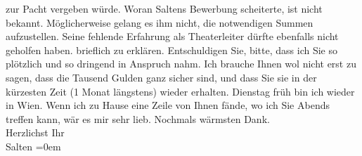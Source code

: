 \begin{ledgroupsized}[t]{13cm}
{{{                  zur Pacht vergeben würde. Woran Saltens
                  Bewerbung scheiterte, ist nicht bekannt. Möglicherweise gelang es ihm nicht, die
                  notwendigen Summen aufzustellen. Seine fehlende Erfahrung als Theaterleiter dürfte
                  ebenfalls nicht geholfen haben.}}}\label{K_L03291-1h} brieflich zu erklären. Entschuldigen Sie,
               bitte, dass ich Sie so plötzlich und so dringend in Anspruch nahm. Ich brauche Ihnen
               wol nicht erst zu sagen, dass die Tausend Gulden ganz sicher sind, und dass Sie sie
               in der kürzesten Zeit (1 Monat längstens) wieder erhalten. \pend
           \pstart
           Dienstag früh bin ich wieder in Wien.
               Wenn ich zu Hause eine Zeile von Ihnen fände, wo ich Sie Abends {\pb}treffen kann, wär es mir sehr
               lieb.\pend
           \pstart
           Nochmals wärmsten Dank.{\\[\baselineskip]}Herzlichst Ihr{\\[\baselineskip]}\spacefill\mbox{Salten}\pend
           \leftskip=0em{}
         
         \endnumbering{}\end{ledgroupsized}\begin{anhang}\end{anhang}\newcommand{\dateiname}{L03291}\newcommand{\titel}{Felix Salten an Arthur Schnitzler, 6. 9. 1899}\newcommand{\editorInnen}{Martin Anton Müller und Laura Untner}
      
